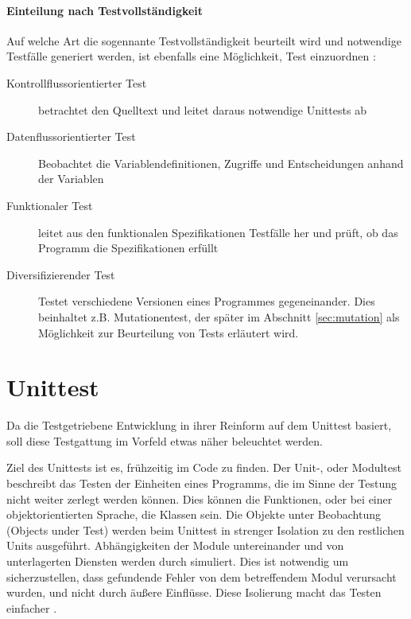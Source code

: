\paragraph{Einteilung nach Testvollständigkeit} Auf welche Art die sogennante Testvollständigkeit beurteilt wird und notwendige Testfälle generiert werden, ist ebenfalls eine Möglichkeit, Test einzuordnen \citep{liggesmeyer_modultest_1990}:
\begin{description}
 \item[Kontrollflussorientierter Test] betrachtet den Quelltext und leitet daraus notwendige Unittests ab
 \item[Datenflussorientierter Test] Beobachtet die Variablendefinitionen, Zugriffe und Entscheidungen anhand der Variablen
 \item[Funktionaler Test] leitet aus den funktionalen Spezifikationen Testfälle her und prüft, ob das Programm die Spezifikationen erfüllt
 \item[Diversifizierender Test] Testet verschiedene Versionen eines Programmes gegeneinander. Dies beinhaltet z.B. Mutationentest, der später im Abschnitt \ref{sec:mutation} \textit{} als Möglichkeit zur Beurteilung von Tests erläutert wird.
\end{description}
\section{Unittest}
\label{sec:testUnit}
Da die Testgetriebene Entwicklung in ihrer Reinform auf dem Unittest basiert, soll diese Testgattung im Vorfeld etwas näher beleuchtet werden.

Ziel des Unittests ist es, frühzeitig  im Code zu finden. Der Unit-, oder Modultest beschreibt das Testen der Einheiten eines Programms, die im Sinne der Testung nicht weiter zerlegt werden können. Dies können die Funktionen, oder bei einer objektorientierten Sprache, die Klassen sein. Die Objekte unter Beobachtung (Objects under Test) werden beim Unittest in strenger Isolation zu den restlichen Units ausgeführt. Abhängigkeiten der Module untereinander und von unterlagerten Diensten werden durch  simuliert. Dies ist notwendig um sicherzustellen, dass gefundende Fehler von dem betreffendem Modul verursacht wurden, und nicht durch äußere Einflüsse. Diese Isolierung macht das Testen einfacher \citep{goodliffe_code_2006,liggesmeyer_modultest_1990}.



